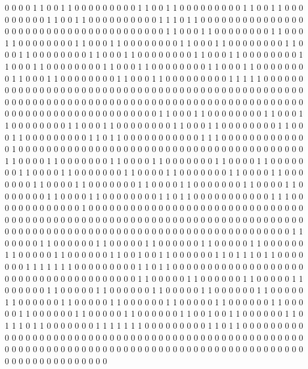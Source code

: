 0 0 0 0 1 1 0 0 1 1 0 0 0 0 0
0 0 0 0 1 1 0 0 1 1 0 0 0 0 0
0 0 0 0 1 1 0 0 1 1 0 0 0 0 0
0 0 0 0 1 1 0 0 1 1 0 0 0 0 0
0 0 0 0 0 1 1 1 0 1 1 0 0 0 0
0 0 0 0 0 0 0 0 0 0 0 0 0 0 0
0 0 0 0 0 0 0 0 0 0 0 0 0 0 0
0 0 0 0 1 1 0 0 0 1 1 0 0 0 0
0 0 0 0 1 1 0 0 0 1 1 0 0 0 0
0 0 0 0 1 1 0 0 0 1 1 0 0 0 0
0 0 0 0 1 1 0 0 0 1 1 0 0 0 0
0 0 0 0 1 1 0 0 0 1 1 0 0 0 0
0 0 0 0 1 1 0 0 0 1 1 0 0 0 0
0 0 0 0 1 1 0 0 0 1 1 0 0 0 0
0 0 0 0 1 1 0 0 0 1 1 0 0 0 0
0 0 0 0 1 1 0 0 0 1 1 0 0 0 0
0 0 0 0 1 1 0 0 0 1 1 0 0 0 0
0 0 0 0 1 1 0 0 0 1 1 0 0 0 0
0 0 0 0 1 1 0 0 0 1 1 0 0 0 0
0 0 0 0 0 1 1 1 1 1 0 0 0 0 0
0 0 0 0 0 0 0 0 0 0 0 0 0 0 0
0 0 0 0 0 0 0 0 0 0 0 0 0 0 0
0 0 0 0 0 0 0 0 0 0 0 0 0 0 0
0 0 0 0 0 0 0 0 0 0 0 0 0 0 0
0 0 0 0 0 0 0 0 0 0 0 0 0 0 0
0 0 0 0 0 0 0 0 0 0 0 0 0 0 0
0 0 0 0 0 0 0 0 0 0 0 0 0 0 0
0 0 0 0 1 1 0 0 0 1 1 0 0 0 0
0 0 0 0 1 1 0 0 0 1 1 0 0 0 0
0 0 0 0 1 1 0 0 0 1 1 0 0 0 0
0 0 0 0 1 1 0 0 0 1 1 0 0 0 0
0 0 0 0 1 1 0 0 0 1 1 0 0 0 0
0 0 0 0 0 1 1 0 1 1 0 0 0 0 0
0 0 0 0 0 0 1 1 1 0 0 0 0 0 0
0 0 0 0 0 0 0 1 0 0 0 0 0 0 0
0 0 0 0 0 0 0 0 0 0 0 0 0 0 0
0 0 0 0 0 0 0 0 0 0 0 0 0 0 0
0 0 0 0 1 1 0 0 0 0 1 1 0 0 0
0 0 0 0 1 1 0 0 0 0 1 1 0 0 0
0 0 0 0 1 1 0 0 0 0 1 1 0 0 0
0 0 0 0 1 1 0 0 0 0 1 1 0 0 0
0 0 0 0 1 1 0 0 0 0 1 1 0 0 0
0 0 0 0 1 1 0 0 0 0 1 1 0 0 0
0 0 0 0 1 1 0 0 0 0 1 1 0 0 0
0 0 0 0 1 1 0 0 0 0 1 1 0 0 0
0 0 0 0 1 1 0 0 0 0 1 1 0 0 0
0 0 0 0 1 1 0 0 0 0 1 1 0 0 0
0 0 0 0 0 1 1 0 1 1 0 0 0 0 0
0 0 0 0 0 0 1 1 1 0 0 0 0 0 0
0 0 0 0 0 0 0 1 0 0 0 0 0 0 0
0 0 0 0 0 0 0 0 0 0 0 0 0 0 0
0 0 0 0 0 0 0 0 0 0 0 0 0 0 0
0 0 0 0 0 0 0 0 0 0 0 0 0 0 0
0 0 0 0 0 0 0 0 0 0 0 0 0 0 0
0 0 0 0 0 0 0 0 0 0 0 0 0 0 0
0 0 0 0 0 0 0 0 0 0 0 0 0 0 0
0 0 0 0 0 0 0 0 0 0 0 0 0 0 0
0 0 0 1 1 0 0 0 0 0 1 1 0 0 0
0 0 0 1 1 0 0 0 0 0 1 1 0 0 0
0 0 0 1 1 0 0 0 0 0 1 1 0 0 0
0 0 0 1 1 0 0 0 0 0 1 1 0 0 0
0 0 0 1 1 0 0 1 0 0 1 1 0 0 0
0 0 0 1 1 0 1 1 1 0 1 1 0 0 0
0 0 0 0 1 1 1 1 1 1 1 0 0 0 0
0 0 0 0 0 1 1 0 1 1 0 0 0 0 0
0 0 0 0 0 0 0 0 0 0 0 0 0 0 0
0 0 0 0 0 0 0 0 0 0 0 0 0 0 0
0 0 0 1 1 0 0 0 0 0 1 1 0 0 0
0 0 0 1 1 0 0 0 0 0 1 1 0 0 0
0 0 0 1 1 0 0 0 0 0 1 1 0 0 0
0 0 0 1 1 0 0 0 0 0 1 1 0 0 0
0 0 0 1 1 0 0 0 0 0 1 1 0 0 0
0 0 0 1 1 0 0 0 0 0 1 1 0 0 0
0 0 0 1 1 0 0 0 0 0 1 1 0 0 0
0 0 0 1 1 0 0 0 0 0 1 1 0 0 0
0 0 0 1 1 0 0 0 0 0 1 1 0 0 0
0 0 0 1 1 0 0 1 0 0 1 1 0 0 0
0 0 0 1 1 0 1 1 1 0 1 1 0 0 0
0 0 0 0 1 1 1 1 1 1 1 0 0 0 0
0 0 0 0 0 1 1 0 1 1 0 0 0 0 0
0 0 0 0 0 0 0 0 0 0 0 0 0 0 0
0 0 0 0 0 0 0 0 0 0 0 0 0 0 0
0 0 0 0 0 0 0 0 0 0 0 0 0 0 0
0 0 0 0 0 0 0 0 0 0 0 0 0 0 0
0 0 0 0 0 0 0 0 0 0 0 0 0 0 0
0 0 0 0 0 0 0 0 0 0 0 0 0 0 0
0 0 0 0 0 0 0 0 0 0 0 0 0 0 0
